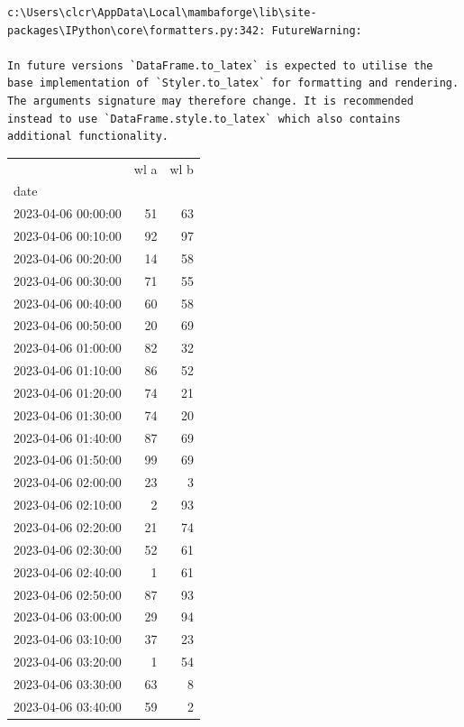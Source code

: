 \documentclass[
  letterpaper,
  DIV=11,
  numbers=noendperiod]{scrartcl}
\begin{document}
\begin{verbatim}
c:\Users\clcr\AppData\Local\mambaforge\lib\site-packages\IPython\core\formatters.py:342: FutureWarning:

In future versions `DataFrame.to_latex` is expected to utilise the base implementation of `Styler.to_latex` for formatting and rendering. The arguments signature may therefore change. It is recommended instead to use `DataFrame.style.to_latex` which also contains additional functionality.
\end{verbatim}

\begin{tabular}{lrr}
\toprule
{} &  wl a &  wl b \\
date                &       &       \\
\midrule
2023-04-06 00:00:00 &    51 &    63 \\
2023-04-06 00:10:00 &    92 &    97 \\
2023-04-06 00:20:00 &    14 &    58 \\
2023-04-06 00:30:00 &    71 &    55 \\
2023-04-06 00:40:00 &    60 &    58 \\
2023-04-06 00:50:00 &    20 &    69 \\
2023-04-06 01:00:00 &    82 &    32 \\
2023-04-06 01:10:00 &    86 &    52 \\
2023-04-06 01:20:00 &    74 &    21 \\
2023-04-06 01:30:00 &    74 &    20 \\
2023-04-06 01:40:00 &    87 &    69 \\
2023-04-06 01:50:00 &    99 &    69 \\
2023-04-06 02:00:00 &    23 &     3 \\
2023-04-06 02:10:00 &     2 &    93 \\
2023-04-06 02:20:00 &    21 &    74 \\
2023-04-06 02:30:00 &    52 &    61 \\
2023-04-06 02:40:00 &     1 &    61 \\
2023-04-06 02:50:00 &    87 &    93 \\
2023-04-06 03:00:00 &    29 &    94 \\
2023-04-06 03:10:00 &    37 &    23 \\
2023-04-06 03:20:00 &     1 &    54 \\
2023-04-06 03:30:00 &    63 &     8 \\
2023-04-06 03:40:00 &    59 &     2 \\

\end{tabular}
\end{document}
